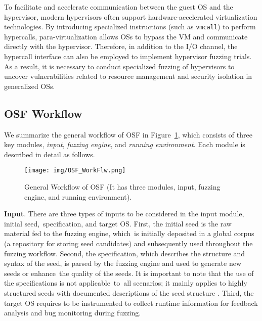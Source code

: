 
To facilitate and accelerate communication between the guest OS and the hypervisor, modern hypervisors often support hardware-accelerated virtualization technologies. By introducing specialized instructions (such as \texttt{vmcall}) to perform hypercalls, para-virtualization allows OSs to bypass the VM and communicate directly with the hypervisor. Therefore, in addition to the I/O channel, the hypercall interface can also be employed to implement hypervisor fuzzing trials. As a result, it is necessary to conduct specialized fuzzing of hypervisors to uncover vulnerabilities related to resource management and security isolation in generalized OSs.


\subsection{OSF Workflow}\label{Section3-3}

We summarize the general workflow of OSF in Figure~\ref{OSF_WorkFlow}, which consists of three key modules, \ie \textit{input}, \textit{fuzzing engine}, and \textit{running environment}. Each module is described in detail as follows.

\begin{figure}[!t]
  \centering
  \texttt{[image: img/OSF\_WorkFlw.png]}
  \caption{General Workflow of OSF (It has three modules, \ie input, fuzzing engine, and running environment).}
  \label{OSF_WorkFlow}
\end{figure}

\textbf{Input}. There are three types of inputs to be considered in the input module, \ie initial seed,~specification, and target OS. First, the initial seed is the raw material fed to the fuzzing engine, which~is initially deposited in a global corpus (\ie a repository for storing seed candidates) and subsequently used throughout the fuzzing workflow. Second, the specification, which describes the structure and syntax of the seed, is parsed by the fuzzing engine and used to generate new seeds or enhance~the quality of the seeds. It is important to note that the use of the specifications is not applicable~to~all scenarios; it mainly applies to highly structured seeds with documented descriptions of the seed structure \cite{Syzkaller, chen2020koobe, zhao2022statefuzz, sun2021healer, shen2021rtkaller, shen2022tardis, jeong2023segfuzz, xu2020krace, jeong2019razzer}. Third, the target OS requires to be instrumented to collect runtime information for feedback analysis and bug monitoring during fuzzing.

